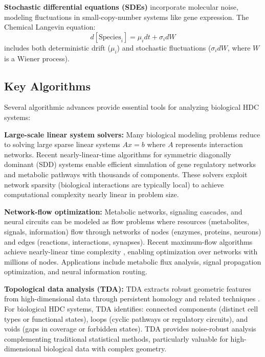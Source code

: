 \documentclass[12pt]{article}
\begin{document}
\textbf{Stochastic differential equations (SDEs)} incorporate molecular noise, modeling fluctuations in small-copy-number systems like gene expression. The Chemical Langevin equation:
\begin{equation}
d[\text{Species}_i] = \mu_i dt + \sigma_i dW
\end{equation}
includes both deterministic drift ($\mu_i$) and stochastic fluctuations ($\sigma_i dW$, where $W$ is a Wiener process).

\subsection{Key Algorithms}

Several algorithmic advances provide essential tools for analyzing biological HDC systems:

\textbf{Large-scale linear system solvers:} Many biological modeling problems reduce to solving large sparse linear systems $Ax = b$ where $A$ represents interaction networks. Recent nearly-linear-time algorithms for symmetric diagonally dominant (SDD) systems \citep{Cohen2014} enable efficient simulation of gene regulatory networks and metabolic pathways with thousands of components. These solvers exploit network sparsity (biological interactions are typically local) to achieve computational complexity nearly linear in problem size.

\textbf{Network-flow optimization:} Metabolic networks, signaling cascades, and neural circuits can be modeled as flow problems where resources (metabolites, signals, information) flow through networks of nodes (enzymes, proteins, neurons) and edges (reactions, interactions, synapses). Recent maximum-flow algorithms achieve nearly-linear time complexity \citep{Chen2022}, enabling optimization over networks with millions of nodes. Applications include metabolic flux analysis, signal propagation optimization, and neural information routing.

\textbf{Topological data analysis (TDA):} TDA extracts robust geometric features from high-dimensional data through persistent homology and related techniques \citep{Carlsson2009}. For biological HDC systems, TDA identifies: connected components (distinct cell types or functional states), loops (cyclic pathways or regulatory circuits), and voids (gaps in coverage or forbidden states). TDA provides noise-robust analysis complementing traditional statistical methods, particularly valuable for high-dimensional biological data with complex geometry.
\end{document}
